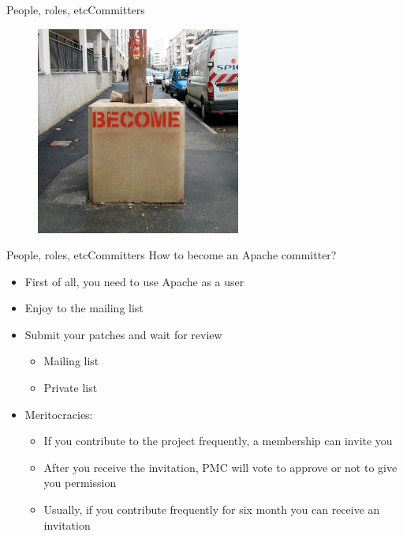 \documentclass[10pt]{beamer}
\begin{document}
\begin{frame}{People, roles, etc}{Committers}
  \begin{figure}[ht]
    \centering
    \includegraphics[width=0.6\textwidth, keepaspectratio=true]{images/become.jpg}
  \end{figure}
\end{frame}

\begin{frame}{People, roles, etc}{Committers}
  How to become an Apache committer? \pause
  \begin{itemize}
    \item First of all, you need to use Apache as a user \pause
    \item Enjoy to the mailing list \pause
    \item Submit your patches and wait for review \pause
    \begin{itemize}
      \item Mailing list \pause
      \item Private list \pause
    \end{itemize}
    \item Meritocracies:
    \begin{itemize}
      \item If you contribute to the project frequently, a membership can
            invite you \pause
      \item After you receive the invitation, PMC will vote to approve or not
            to give you permission \pause
      \item Usually, if you contribute frequently for six month you can receive
            an invitation
    \end{itemize}
  \end{itemize}
\end{frame}
\end{document}
